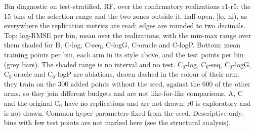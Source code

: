 Bin diagnostic on test-stratified, RF, over the confirmatory realizations r1-r5: the 15 bins of the selection range and the two zones outside it, half-open, [lo, hi), as everywhere the replication metrics are read; edges are rounded to two decimals. Top: log-RMSE per bin, mean over the realizations, with the min-max range over them shaded for B, C-log, C-seq, C-logG, C-oracle and C-logP. Bottom: mean training points per bin, each arm in its style above, and the test points per bin (grey bars). The shaded range is no interval and no test. C$_0$-log, C$_0$-seq, C$_0$-logG, C$_0$-oracle and C$_0$-logP are ablations, drawn dashed in the colour of their arm: they train on the 300 added points without the seed, against the 600 of the other arms, so they join different budgets and are not like-for-like comparisons. A, C and the original C$_0$ have no replications and are not drawn; r0 is exploratory and is not drawn. Common hyper-parameters fixed from the seed. Descriptive only; bins with few test points are not marked here (see the structural analysis).
